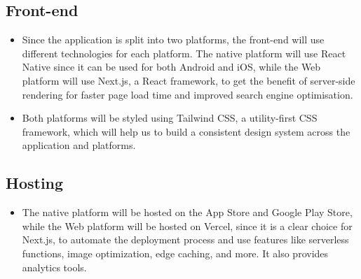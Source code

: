 \subsection{Front-end}
\begin{itemize}
  \item Since the application is split into two platforms, the front-end will use different technologies for each platform. The native platform will use React Native since it can be used for both Android and iOS, while the Web platform will use Next.js, a React framework, to get the benefit of server-side rendering for faster page load time and improved search engine optimisation.
  \item Both platforms will be styled using Tailwind CSS, a utility-first CSS framework, which will help us to build a consistent design system across the application and platforms.
\end{itemize}

\subsection{Hosting}
\begin{itemize}
  \item The native platform will be hosted on the App Store and Google Play Store, while the Web platform will be hosted on Vercel, since it is a clear choice for Next.js, to automate the deployment process and use features like serverless functions, image optimization, edge caching, and more. It also provides analytics tools.
\end{itemize}

\clearpage